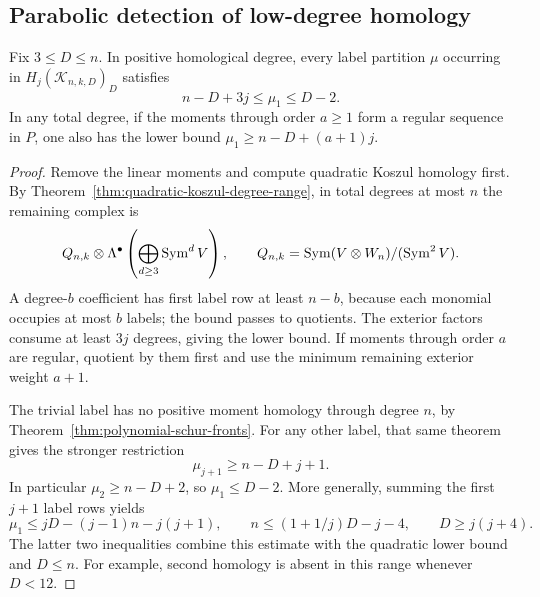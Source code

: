 \subsection{Parabolic detection of low-degree homology}

\begin{lemma}
\label{lem:parabolic-koszul-detection}
Fix $3\le D\le n$. In positive homological degree, every
label partition $\mu$ occurring in
$H_j(\mathcal K_{n,k,D})_D$ satisfies
\begin{equation}\label{eq:moment-koszul-homology-strip}
 n-D+3j\le\mu_1\le D-2.
\end{equation}
In any total degree, if the moments through order $a\ge1$ form a
regular sequence in $P$, one also has the lower bound
$\mu_1\ge n-D+(a+1)j$.
\end{lemma}

\begin{proof}
Remove the linear moments and compute quadratic Koszul homology first.
By Theorem~\ref{thm:quadratic-koszul-degree-range}, in total degrees at
most $n$ the remaining complex is
\[
 Q_{n,k}\otimes\Lambda^\bullet
       \left(\bigoplus_{d\ge3}\operatorname{Sym}^dV\right),
 \qquad Q_{n,k}=\operatorname{Sym}(V\otimes W_n)/(\operatorname{Sym}^2V).
\]
A degree-$b$ coefficient has first label row at least $n-b$, because
each monomial occupies at most $b$ labels; the bound passes to quotients.
The exterior factors consume at least $3j$ degrees, giving the lower
bound. If moments through order $a$ are regular, quotient by them first
and use the minimum remaining exterior weight $a+1$.

The trivial label has no positive moment homology through degree $n$,
by Theorem~\ref{thm:polynomial-schur-fronts}. For any other label, that
same theorem gives the stronger restriction
\begin{equation}\label{eq:polynomial-higher-label-support}
                  \mu_{j+1}\ge n-D+j+1.
\end{equation}
In particular $\mu_2\ge n-D+2$, so $\mu_1\le D-2$.
More generally, summing the first $j+1$ label rows yields
\[
 \mu_1\le jD-(j-1)n-j(j+1),\qquad
 n\le(1+1/j)D-j-4,\qquad D\ge j(j+4).
\]
The latter two inequalities combine this estimate with the quadratic
lower bound and $D\le n$. For example, second homology is absent in
this range whenever $D<12$.
\end{proof}


